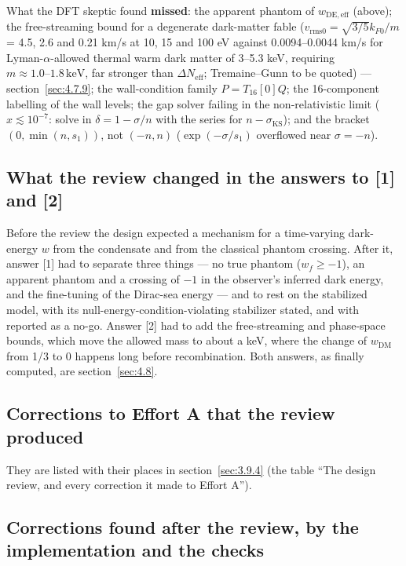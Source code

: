 What the DFT skeptic found \textbf{missed}: the apparent phantom of $w_{\mathrm{DE,eff}}$ (above); the free-streaming bound for a degenerate dark-matter fable ($v_{\mathrm{rms}0} = \sqrt{3/5} k_{F0}/m$ = 4.5, 2.6 and 0.21 km/s at 10, 15 and 100 eV against 0.0094--0.0044 km/s for Lyman-$\alpha$-allowed thermal warm dark matter of 3--5.3 keV, requiring $m\approx1.0\text{--}1.8\,\mathrm{keV}$, far stronger than $\Delta N_{\mathrm{eff}}$; Tremaine--Gunn to be quoted) --- section~\ref{sec:4.7.9}; the wall-condition family $P = T_{16}[0] Q$; the 16-component labelling of the wall levels; the gap solver failing in the non-relativistic limit ($x \lesssim 10^{-7}$: solve in $\delta = 1 - \sigma/n$ with the series for $n - \sigma_{\mathrm{KS}}$); and the  bracket $(0, \min(n, s_1))$, not $(-n, n)$ ($\exp(-\sigma/s_1)$ overflowed near $\sigma = -n$).

\subsection{What the review changed in the answers to [1] and [2]}
\label{sec:5.6}

Before the review the design expected a mechanism for a time-varying dark-energy $w$ from the condensate and from the classical phantom crossing. After it, answer [1] had to separate three things --- no true phantom ($w_f \geq -1$), an apparent phantom and a crossing of $-1$ in the observer's inferred dark energy, and the fine-tuning of the Dirac-sea energy --- and to rest on the stabilized model, with its null-energy-condition-violating stabilizer stated, and with  reported as a no-go. Answer [2] had to add the free-streaming and phase-space bounds, which move the allowed mass to about a keV, where the change of $w_{\mathrm{DM}}$ from 1/3 to 0 happens long before recombination. Both answers, as finally computed, are section~\ref{sec:4.8}.

\subsection{Corrections to Effort A that the review produced}
\label{sec:5.7}

They are listed with their places in section~\ref{sec:3.9.4} (the table ``The design review, and every correction it made to Effort A'').

\subsection{Corrections found after the review, by the implementation and the checks}
\label{sec:5.8}


